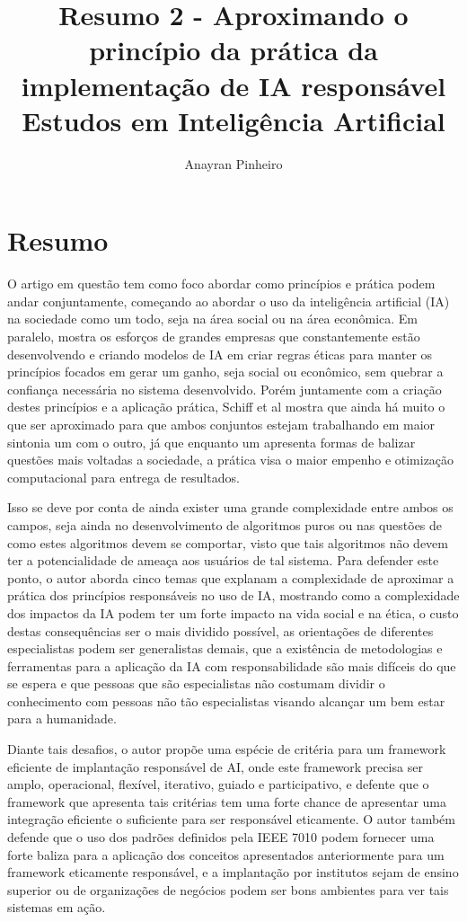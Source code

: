 \documentclass{article}
\title{Resumo 2 - Aproximando o princípio da prática da implementação de IA responsável   \\ \small Estudos em Inteligência Artificial}
\author{Anayran Pinheiro}
\begin{document}
\maketitle

\section{Resumo}

O artigo em questão tem como foco abordar como princípios e prática podem andar conjuntamente, começando ao abordar o uso da inteligência artificial (IA) na sociedade como um todo, seja na área social ou na área econômica. Em paralelo, mostra os esforços de grandes empresas que constantemente estão desenvolvendo e criando modelos de IA em criar regras éticas para manter os princípios focados em gerar um ganho, seja social ou econômico, sem quebrar a confiança necessária no sistema desenvolvido. Porém juntamente com a criação destes princípios e a aplicação prática, Schiff et al mostra que ainda há muito o que ser aproximado para que ambos conjuntos estejam trabalhando em maior sintonia um com o outro, já que enquanto um apresenta formas de balizar questões mais voltadas a sociedade, a prática visa o maior empenho e otimização computacional para entrega de resultados.

Isso se deve por conta de ainda exister uma grande complexidade entre ambos os campos, seja ainda no desenvolvimento de algoritmos puros ou nas questões de como estes algoritmos devem se comportar, visto que tais algoritmos não devem ter a potencialidade de ameaça aos usuários de tal sistema. Para defender este ponto, o autor aborda cinco temas que explanam a complexidade de aproximar a prática dos princípios responsáveis no uso de IA, mostrando como a complexidade dos impactos da IA podem ter um forte impacto na vida social e na ética, o custo destas consequências ser o mais dividido possível, as orientações de diferentes especialistas podem ser generalistas demais, que a existência de metodologias e ferramentas para a aplicação da IA com responsabilidade são mais difíceis do que se espera e que pessoas que são especialistas não costumam dividir o conhecimento com pessoas não tão especialistas visando alcançar um bem estar para a humanidade.

Diante tais desafios, o autor propõe uma espécie de critéria para um framework eficiente de implantação responsável de AI, onde este framework precisa ser amplo, operacional, flexível, iterativo, guiado e participativo, e defente que o framework que apresenta tais critérias tem uma forte chance de apresentar uma integração eficiente o suficiente para ser responsável eticamente. O autor também defende que o uso dos padrões definidos pela IEEE 7010 podem fornecer uma forte baliza para a aplicação dos conceitos apresentados anteriormente para um framework eticamente responsável, e a implantação por institutos sejam de ensino superior ou de organizações de negócios podem ser bons ambientes para ver tais sistemas em ação.
\end{document}
